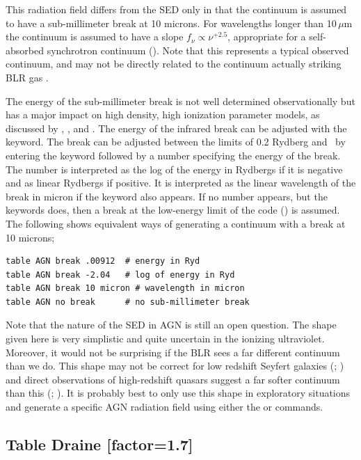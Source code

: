 This radiation field differs from the \citet{Mathews1987} SED
only in that the continuum is assumed to have a sub-millimeter break at
10 microns.
For wavelengths longer than 10\,$\mu$m the continuum is assumed
to have a slope $f_\nu\propto \nu^{+2.5}$,
appropriate for a self-absorbed synchrotron
continuum (\citealp{Rybicki1979}).
Note that this represents a typical
observed continuum,
and may not be directly related to the continuum actually
striking BLR gas \citep{KoristaFerlandBaldwin1997}.

The energy of the sub-millimeter break is not well determined
observationally but has a major impact on high density, high ionization
parameter models, as discussed by \citet{Ferland1989}, \citet{FerlandPeterson1992}, and \citet{Ferland1999a}.  The energy of the infrared break can be
adjusted with the  keyword.
The break can be adjusted between the
limits of 0.2 Rydberg and \emm\
by entering the keyword 
followed by a number specifying the energy of the break.  The number is
interpreted as the log of the energy in Rydbergs if it is negative and as
linear Rydbergs if positive.  It is interpreted as the linear wavelength
of the break in micron if the keyword \cdCommand{micron} also appears.
If no number appears, but the keywords \cdCommand{no break} does,
then a break at the low-energy
limit of the code (\emm ) is assumed.
The following shows
equivalent ways of generating a continuum with a break at 10 microns;
\begin{verbatim}
table AGN break .00912  # energy in Ryd
table AGN break -2.04   # log of energy in Ryd
table AGN break 10 micron # wavelength in micron
table AGN no break      # no sub-millimeter break
\end{verbatim}
Note that the nature of the SED in AGN is still an open question.  The
shape given here is very simplistic and quite uncertain in the
ionizing ultraviolet.  Moreover, it would not be surprising if the BLR
sees a far different continuum than we do.  This shape may not be
correct for low redshift Seyfert galaxies (\citealp{Binette1989};
\citealp{Clavel1990}) and direct observations of high-redshift quasars
suggest a far softer continuum than this (\citealp{Zheng1997};
\citealp{KoristaFerlandBaldwin1997}).
It is
probably best to only use this shape in exploratory situations and
generate a specific AGN radiation field using either the
 or  commands.

\subsection{Table Draine [factor=1.7]}

